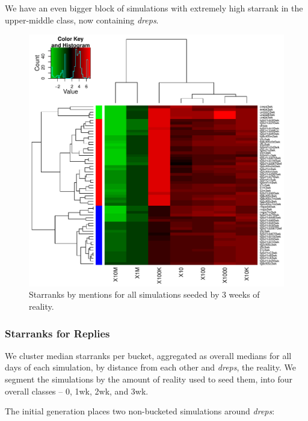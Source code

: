 \documentclass[10pt,oneside]{memoir}
\begin{document}
\begin{Spacing}{2}
We have an even bigger block of simulations with extremely high starrank in the upper-middle class, now containing {\itshape dreps}.



\begin{figure}
\begin{center}
    \includegraphics{figures/crop/heatmap-sbucks-ments-star-med-medians-3wk}
    \caption{Starranks by mentions for all simulations seeded by 3 weeks of reality.}
    \label{figure:heatmap-sbucks-ments-star-med-medians-3wk}
\end{center}
\end{figure}
\pagebreak \subsubsection{Starranks for Replies}
\label{starranksforreplies}

We cluster median starranks per bucket, aggregated as overall medians for all days of each simulation, by distance from each other and {\itshape dreps}, the reality.  We segment the simulations by the amount of reality used to seed them, into four overall classes -- 0, 1wk, 2wk, and 3wk.


The initial generation places two non-bucketed simulations around {\itshape dreps}:


\begin{itemize}



\end{itemize}
\end{Spacing}
\end{document}

